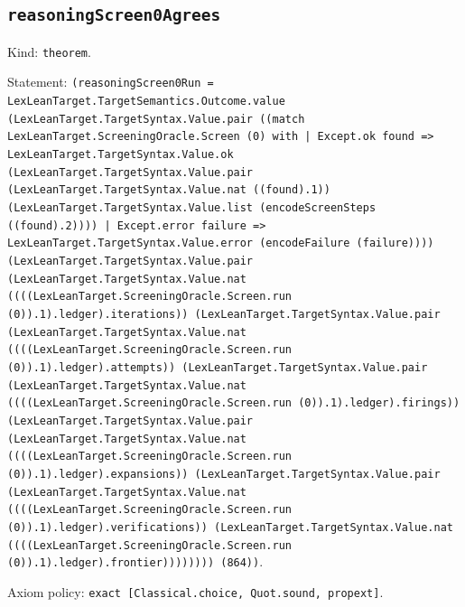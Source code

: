 \documentclass[11pt]{article}
\begin{document}
\subsection*{\texttt{reasoningScreen0Agrees}}
\noindent Kind: \texttt{theorem}.\par
\noindent Statement: \texttt{(reasoningScreen0Run = LexLeanTarget.TargetSemantics.Outcome.value (LexLeanTarget.TargetSyntax.Value.pair ((match LexLeanTarget.ScreeningOracle.Screen (0) with | Except.ok found => LexLeanTarget.TargetSyntax.Value.ok (LexLeanTarget.TargetSyntax.Value.pair (LexLeanTarget.TargetSyntax.Value.nat ((found).1)) (LexLeanTarget.TargetSyntax.Value.list (encodeScreenSteps ((found).2)))) | Except.error failure => LexLeanTarget.TargetSyntax.Value.error (encodeFailure (failure)))) (LexLeanTarget.TargetSyntax.Value.pair (LexLeanTarget.TargetSyntax.Value.nat ((((LexLeanTarget.ScreeningOracle.Screen.run (0)).1).ledger).iterations)) (LexLeanTarget.TargetSyntax.Value.pair (LexLeanTarget.TargetSyntax.Value.nat ((((LexLeanTarget.ScreeningOracle.Screen.run (0)).1).ledger).attempts)) (LexLeanTarget.TargetSyntax.Value.pair (LexLeanTarget.TargetSyntax.Value.nat ((((LexLeanTarget.ScreeningOracle.Screen.run (0)).1).ledger).firings)) (LexLeanTarget.TargetSyntax.Value.pair (LexLeanTarget.TargetSyntax.Value.nat ((((LexLeanTarget.ScreeningOracle.Screen.run (0)).1).ledger).expansions)) (LexLeanTarget.TargetSyntax.Value.pair (LexLeanTarget.TargetSyntax.Value.nat ((((LexLeanTarget.ScreeningOracle.Screen.run (0)).1).ledger).verifications)) (LexLeanTarget.TargetSyntax.Value.nat ((((LexLeanTarget.ScreeningOracle.Screen.run (0)).1).ledger).frontier)))))))) (864))}.\par
\noindent Axiom policy: \texttt{exact [Classical.choice, Quot.sound, propext]}.\par
\end{document}
